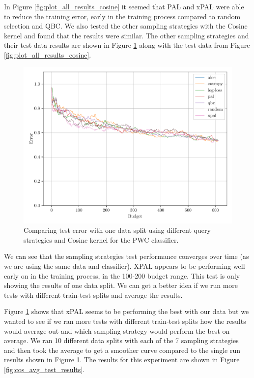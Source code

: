 In Figure \ref{fig:plot_all_results_cosine} it seemed that PAL and xPAL were able to reduce the training error, early in the training process compared to random selection and QBC. We also tested the other sampling strategies with the Cosine kernel and found that the results were similar. The other sampling strategies and their test data results are shown in Figure \ref{fig:cos_test_results} along with the test data from Figure \ref{fig:plot_all_results_cosine}. 


\begin{figure}[ht]
    \centering
    \includegraphics[width=\scale\textwidth]{../img/plot_kernel_cos_test_results.pdf}
    \caption{Comparing test error with one data split using different query strategies and Cosine kernel for the PWC classifier.}
    \label{fig:cos_test_results}
\end{figure}

We can see that the sampling strategies test performance converges over time (as we are using the same data and classifier). XPAL appears to be performing well early on in the training process, in the 100-200 budget range. This test is only showing the results of one data split. We can get a better idea if we run more tests with different train-test splits and average the results.

Figure \ref{fig:cos_test_results} shows that xPAL seems to be performing the best with our data but we wanted to see if we ran more tests with different train-test splits how the results would average out and which sampling strategy would perform the best on average. We ran 10 different data splits with each of the 7 sampling strategies and then took the average to get a smoother curve compared to the single run results shown in Figure \ref{fig:cos_test_results}. The results for this experiment are shown in Figure \ref{fig:cos_avg_test_results}. 

